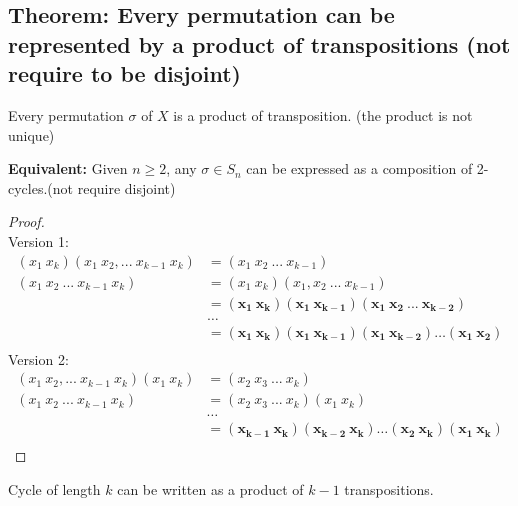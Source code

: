 \documentclass[11pt]{elegantbook}
\begin{document}
\subsection{Theorem: Every permutation can be represented by a product of transpositions (not require to be disjoint)}
\begin{theorem}
    Every permutation $\sigma$ of $X$ is a product of transposition. (the product is not unique)

    \textbf{Equivalent:} Given $n\geq2$, any $\sigma \in S_n$ can be expressed as a composition of 2-cycles.(not require disjoint)
\end{theorem}
\begin{proof}
    \quad\\

    Version 1:
    \begin{equation}
        \begin{aligned}
            (x_1\ x_{k})(x_1\ x_2,...\ x_{k-1}\ x_{k})&=(x_1\ x_2\ ...\ x_{k-1})\\
            (x_1\ x_2\ ...\ x_{k-1}\ x_{k})&=(x_1\ x_{k})(x_1,x_2\ ...\ x_{k-1})\\
            &=\mathbf{(x_1\ x_{k})(x_1\ x_{k-1})(x_1\ x_2\ ...\ x_{k-2})}\\
            &\dots\\
            &=\mathbf{(x_1\ x_{k})(x_1\ x_{k-1})(x_1\ x_{k-2})\dots(x_1\ x_2)}\\
        \end{aligned}
        \nonumber
    \end{equation}
    Version 2:
    \begin{equation}
        \begin{aligned}
            (x_1\ x_2,...\ x_{k-1}\ x_{k})(x_1\ x_{k})&=(x_2\ x_3\ ...\ x_{k})\\
            (x_1\ x_2\ ...\ x_{k-1}\ x_{k})&=(x_2\ x_3\ ...\ x_{k})(x_1\ x_{k})\\
            &\dots\\
            &=\mathbf{(x_{k-1}\ x_{k})(x_{k-2}\ x_{k})\dots(x_2\ x_{k})(x_1\ x_k)}\\
        \end{aligned}
        \nonumber
    \end{equation}
\end{proof}

\begin{claim}
Cycle of length $k$ can be written as a product of $k-1$ transpositions.
\end{claim}
\end{document}
